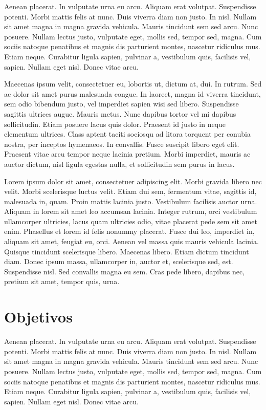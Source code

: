 Aenean placerat. In vulputate urna eu arcu. Aliquam erat volutpat. Suspendisse potenti. Morbi mattis felis at nunc. Duis viverra diam non justo. In nisl. Nullam sit amet magna in magna gravida vehicula. Mauris tincidunt sem sed arcu. Nunc posuere. Nullam lectus justo, vulputate eget, mollis sed, tempor sed, magna. Cum sociis natoque penatibus et magnis dis parturient montes, nascetur ridiculus mus. Etiam neque. Curabitur ligula sapien, pulvinar a, vestibulum quis, facilisis vel, sapien. Nullam eget nisl. Donec vitae arcu.

Maecenas ipsum velit, consectetuer eu, lobortis ut, dictum at, dui. In rutrum. Sed ac dolor sit amet purus malesuada congue. In laoreet, magna id viverra tincidunt, sem odio bibendum justo, vel imperdiet sapien wisi sed libero. Suspendisse sagittis ultrices augue. Mauris metus. Nunc dapibus tortor vel mi dapibus sollicitudin. Etiam posuere lacus quis dolor. Praesent id justo in neque elementum ultrices. Class aptent taciti sociosqu ad litora torquent per conubia nostra, per inceptos hymenaeos. In convallis. Fusce suscipit libero eget elit. Praesent vitae arcu tempor neque lacinia pretium. Morbi imperdiet, mauris ac auctor dictum, nisl ligula egestas nulla, et sollicitudin sem purus in lacus.

Lorem ipsum dolor sit amet, consectetuer adipiscing elit. Morbi gravida libero nec velit. Morbi scelerisque luctus velit. Etiam dui sem, fermentum vitae, sagittis id, malesuada in, quam. Proin mattis lacinia justo. Vestibulum facilisis auctor urna. Aliquam in lorem sit amet leo accumsan lacinia. Integer rutrum, orci vestibulum ullamcorper ultricies, lacus quam ultricies odio, vitae placerat pede sem sit amet enim. Phasellus et lorem id felis nonummy placerat. Fusce dui leo, imperdiet in, aliquam sit amet, feugiat eu, orci. Aenean vel massa quis mauris vehicula lacinia. Quisque tincidunt scelerisque libero. Maecenas libero. Etiam dictum tincidunt diam. Donec ipsum massa, ullamcorper in, auctor et, scelerisque sed, est. Suspendisse nisl. Sed convallis magna eu sem. Cras pede libero, dapibus nec, pretium sit amet, tempor quis, urna.


\section{Objetivos}

Aenean placerat. In vulputate urna eu arcu. Aliquam erat volutpat. Suspendisse potenti. Morbi mattis felis at nunc. Duis viverra diam non justo. In nisl. Nullam sit amet magna in magna gravida vehicula. Mauris tincidunt sem sed arcu. Nunc posuere. Nullam lectus justo, vulputate eget, mollis sed, tempor sed, magna. Cum sociis natoque penatibus et magnis dis parturient montes, nascetur ridiculus mus. Etiam neque. Curabitur ligula sapien, pulvinar a, vestibulum quis, facilisis vel, sapien. Nullam eget nisl. Donec vitae arcu.

